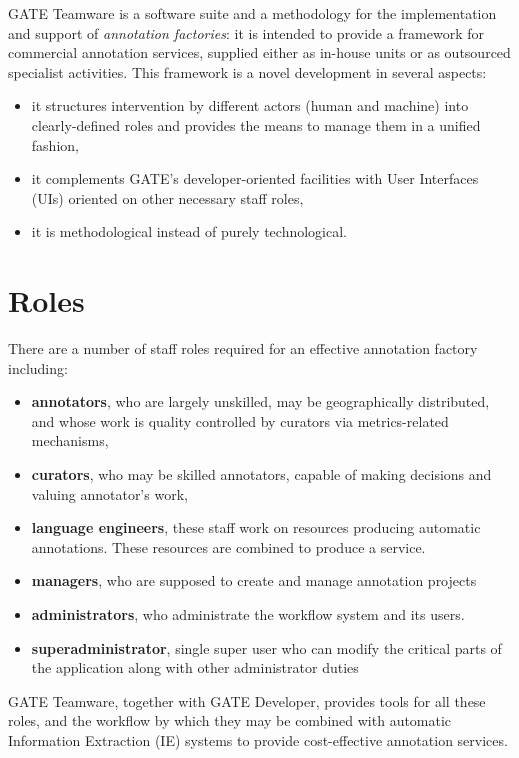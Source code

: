 GATE Teamware  is a software suite and a methodology for the implementation and
support of \emph{annotation factories}: it is intended to provide a framework
for commercial annotation services, supplied either as in-house units or as
outsourced specialist activities. This framework is a novel development in
several aspects:
\begin{itemize}
  \item it structures intervention by different actors (human and machine)
  into clearly-defined roles and provides the means to manage them in a
  unified fashion,
  \item it complements GATE's developer-oriented facilities with User
  Interfaces (UIs) oriented on other necessary staff roles,
  \item it is methodological instead of purely technological.
\end{itemize}

\section{Roles}
There are a number of staff roles required for an effective annotation factory
including:
\begin{itemize}
  \item \textbf{annotators}, who are largely unskilled, may be
  geographically distributed, and whose work is quality controlled by curators
  via metrics-related mechanisms,
  \item \textbf{curators}, who may be skilled annotators, capable of making
  decisions and valuing annotator's work,
  \item \textbf{language engineers}, these staff work on resources producing
  automatic annotations. These resources are combined to produce a service.
  \item \textbf{managers}, who are supposed to create and manage annotation
  projects
  \item \textbf{administrators}, who administrate the workflow system and its
  users.
  \item \textbf{superadministrator}, single super user who can modify the
  critical parts of the application along with other administrator
  duties 
\end{itemize}
GATE Teamware, together with GATE Developer, provides tools for all these roles,
and the workflow by which they may be combined with automatic Information Extraction
(IE) systems to provide cost-effective annotation services.

